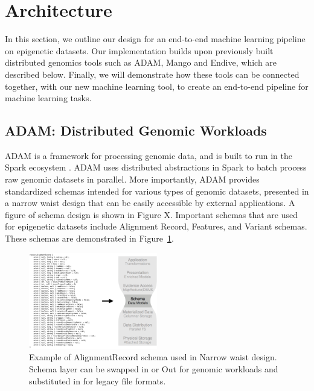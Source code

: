 \documentclass{sig-alternate-05-2015}
\begin{document}
\section{Architecture}
In this section, we outline our design for an end-to-end machine learning pipeline on epigenetic datasets. Our implementation builds upon previously built distributed genomics tools such as ADAM, Mango and Endive, which are described below. Finally, we will demonstrate how these tools can be connected together, with our new machine learning tool, to create an end-to-end pipeline for machine learning tasks. \\

\subsection{ADAM: Distributed Genomic Workloads}
ADAM is a framework for processing genomic data, and is built to run in the Spark ecosystem \cite{adam}. ADAM uses distributed abstractions in Spark to batch process raw genomic datasets in parallel. More importantly, ADAM provides standardized schemas intended for various types of genomic datasets, presented in a narrow waist design that can be easily accessible by external applications. A figure of schema design is shown in Figure X. Important schemas that are used for epigenetic datasets include Alignment Record, Features, and Variant schemas. These schemas are demonstrated in Figure~\ref{fig:adam}. \\

 \begin{figure}
   \label{fig:adam}
   \includegraphics[width=0.5\textwidth]{figures/adamSchema.png}
   \caption{Example of AlignmentRecord schema used in
   Narrow waist design. Schema layer can be swapped in or
   Out for genomic workloads and substituted in for legacy file formats.}
 \end{figure}
\end{document}
